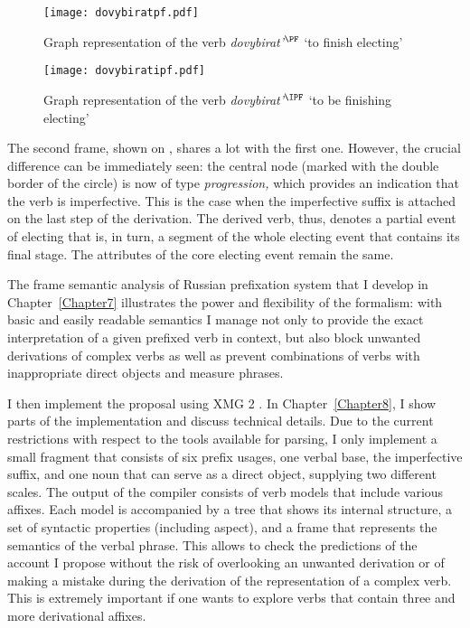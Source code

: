 \begin{figure}[p]
\texttt{[image: dovybiratpf.pdf]}
\caption{Graph representation of the verb \textit{dovybirat'}$^{\PF}$ `to finish electing'\label{graph:pf}}
\end{figure}

\begin{figure}[p]
\texttt{[image: dovybiratipf.pdf]}
\caption{Graph representation of the verb \textit{dovybirat'}$^{\IPF}$ `to be finishing electing'\label{graph:ipf}}
\end{figure}

The second frame, shown on , shares a lot with the first one. However, the crucial difference can be immediately seen: the central node (marked with the double border of the circle) is now of type \textit{progression,} which provides an indication that the verb is imperfective. This is the case when the imperfective suffix is attached on the last step of the derivation. The derived verb, thus, denotes a partial event of electing that is, in turn, a segment of the whole electing event that contains its final stage. The attributes of the core electing event remain the same.

The frame semantic analysis of Russian prefixation system that I develop in Chapter~\ref{Chapter7} illustrates the power and flexibility of the formalism: with basic and easily readable semantics I manage not only to provide the exact interpretation of a given prefixed verb in context, but also block unwanted derivations of complex verbs as well as prevent combinations of verbs with inappropriate direct objects and measure phrases.

I then implement the proposal using XMG 2 \citep{Petitjean:16}. In Chapter~\ref{Chapter8}, I show parts of the implementation and discuss technical details. Due to the current restrictions with respect to the tools available for parsing, I only implement a small fragment that consists of six prefix usages, one verbal base, the imperfective suffix, and one noun that can serve as a direct object, supplying two different scales. The output of the compiler consists of verb models that include various affixes. Each model is accompanied by a tree that shows its internal structure, a set of syntactic properties (including aspect), and a frame that represents the  semantics of the verbal phrase. This allows to check the predictions of the account I propose without the risk of overlooking an unwanted derivation or of making a mistake during the derivation of the representation of a complex verb. This is extremely important if one wants to explore verbs that contain three and more derivational affixes.

